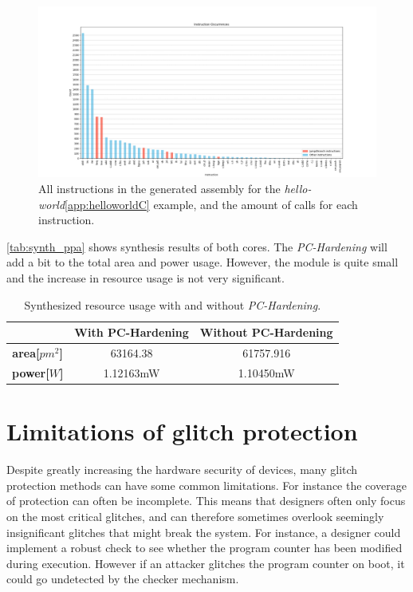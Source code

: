 \begin{figure}[h!]
    \centering
    \includegraphics[width=\textwidth]{docs/images/instruction_occurances_all_legend.png}
    \caption{All instructions in the generated assembly for the \textit{hello-world}\autoref{app:helloworldC} example, and the amount of calls for each instruction.}
    \label{fig:instr_occ}
\end{figure}

\autoref{tab:synth_ppa} shows synthesis results of both cores. The \textit{PC-Hardening} will add a bit to the total area and power usage. However, the module is quite small and the increase in resource usage is not very significant. 

\begin{table}[h]
\centering
\caption{Synthesized resource usage with and without \textit{PC-Hardening}.}
\label{tab:synth_ppa}
\begin{tabular}{ccc}
\toprule 
& With PC-Hardening & Without PC-Hardening \\
\midrule
\rowcolor{black!20} \textbf{area[$pm^2$]} & 63164.38 & 61757.916 \\
\textbf{power[$W$]} & 1.12163mW & 1.10450mW \\
\bottomrule
\end{tabular}
\end{table}

\section{Limitations of glitch protection}
\label{sec:limits}

Despite greatly increasing the hardware security of devices, many glitch protection methods can have some common limitations. For instance the coverage of protection can often be incomplete. This means that designers often only focus on the most critical glitches, and can therefore sometimes overlook seemingly insignificant glitches that might break the system. For instance, a designer could implement a robust check to see whether the program counter has been modified during execution. However if an attacker glitches the program counter on boot, it could go undetected by the checker mechanism. 

